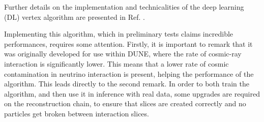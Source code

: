 Further details on the implementation and technicalities of the deep learning (DL) vertex algorithm are presented in Ref. \cite{DUNE:2025wti}. 

Implementing this algorithm, which in preliminary tests claims incredible performances, requires some attention. Firstly, it is important to remark that it was originally developed for use within DUNE, where the rate of cosmic-ray interaction is significantly lower. This means that a lower rate of cosmic contamination in neutrino interaction is present, helping the performance of the algorithm. This leads directly to the second remark. In order to both train the algorithm, and then use it in inference with real data, some upgrades are required on the reconstruction chain, to ensure that slices are created correctly and no particles get broken between interaction slices. 

% 

